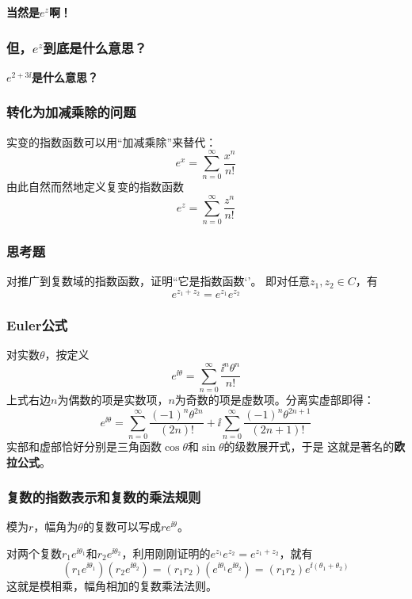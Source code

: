 \documentclass[CJK,13pt]{beamer}
\begin{document}
\begin{frame}
  
  \bcenter
  {\bf \Large 当然是$e^z$啊！}
  \ecenter
  
\end{frame}


\begin{frame}
  \frametitle{但，$e^z$到底是什么意思？}
  
  \bcenter
  {\Large \bf  $e^{2+3\ii}$是什么意思？}
  \ecenter
  
\end{frame}


\begin{frame}
  \frametitle{转化为加减乘除的问题}
  
  实变的指数函数可以用“加减乘除”来替代：
  $$ e^x  = \sum_{n=0}^{\infty} \frac{x^n}{n!}$$
  由此自然而然地定义复变的指数函数
  $$ e^z = \sum_{n=0}^{\infty} \frac{z^n}{n!}$$
  
\end{frame}

\begin{frame}

  \frametitle{思考题}
  
  对推广到复数域的指数函数，证明``它是指数函数‘’。
  即对任意$z_1, z_2\in C$，有
  $$e^{z_1+z_2} = e^{z_1}e^{z_2}$$
  
\end{frame}



\begin{frame}
  \frametitle{Euler公式}
  
  对实数$\theta$，按定义
  $$e^{\ii\theta} = \sum_{n=0}^\infty \frac{\ii^n\theta^n}{n!} $$
  上式右边$n$为偶数的项是实数项，$n$为奇数的项是虚数项。分离实虚部即得：
  $$e^{\ii\theta} = \sum_{n=0}^\infty \frac{(-1)^n\theta^{2n}}{(2n)!} + \ii  \sum_{n=0}^\infty \frac{(-1)^n\theta^{2n+1}}{(2n+1)!}$$
  实部和虚部恰好分别是三角函数$\cos\theta$和$\sin\theta$的级数展开式，于是
  这就是著名的{\bf\blue 欧拉公式}。
  
\end{frame}

\begin{frame}
  \frametitle{复数的指数表示和复数的乘法规则}
  
      {\blue 模为$r$，幅角为$\theta$的复数可以写成$re^{\ii\theta}$。}
      
  对两个复数$r_1e^{\ii \theta_1}$和$r_2e^{\ii\theta_2}$，利用刚刚证明的$e^{z_1}e^{z_2} =e^{z_1+z_2}$，就有
  $$\left(r_1e^{\ii \theta_1}\right)\left(r_2e^{\ii\theta_2}\right) = (r_1r_2)\left(e^{\ii\theta_1}e^{\ii\theta_2}\right)= (r_1r_2)e^{\ii(\theta_1+\theta_2)}$$
      这就是模相乘，幅角相加的复数乘法法则。  
  
  
\end{frame}
\end{document}
